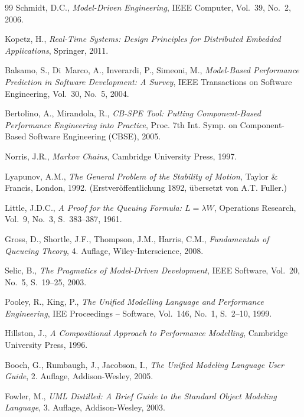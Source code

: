 ﻿\documentclass[a4paper,12pt]{report}
\theoremstyle{definition}
\begin{document}
\begin{thebibliography}{99}
	Schmidt, D.C.,
	\textit{Model-Driven Engineering},
	IEEE Computer, Vol.~39, No.~2, 2006.

	Kopetz, H.,
	\textit{Real-Time Systems: Design Principles for Distributed
		Embedded Applications},
	Springer, 2011.

	Balsamo, S., Di~Marco, A., Inverardi, P., Simeoni, M.,
	\textit{Model-Based Performance Prediction in Software Development:
		A Survey},
	IEEE Transactions on Software Engineering, Vol.~30, No.~5, 2004.

	Bertolino, A., Mirandola, R.,
	\textit{CB-SPE Tool: Putting Component-Based Performance Engineering
		into Practice},
	Proc. 7th Int. Symp. on Component-Based Software Engineering
	(CBSE), 2005.

	Norris, J.R.,
	\textit{Markov Chains},
	Cambridge University Press, 1997.

	Lyapunov, A.M.,
	\textit{The General Problem of the Stability of Motion},
	Taylor \& Francis, London, 1992.
	(Erstveröffentlichung 1892, übersetzt von A.T. Fuller.)

	Little, J.D.C.,
	\textit{A Proof for the Queuing Formula: $L = \lambda W$},
	Operations Research, Vol.~9, No.~3, S.~383--387, 1961.

	Gross, D., Shortle, J.F., Thompson, J.M., Harris, C.M.,
	\textit{Fundamentals of Queueing Theory},
	4. Auflage, Wiley-Interscience, 2008.

	Selic, B.,
	\textit{The Pragmatics of Model-Driven Development},
	IEEE Software, Vol.~20, No.~5, S.~19--25, 2003.

	Pooley, R., King, P.,
	\textit{The Unified Modelling Language and Performance Engineering},
	IEE Proceedings -- Software, Vol.~146, No.~1, S.~2--10, 1999.

	Hillston, J.,
	\textit{A Compositional Approach to Performance Modelling},
	Cambridge University Press, 1996.

	Booch, G., Rumbaugh, J., Jacobson, I.,
	\textit{The Unified Modeling Language User Guide},
	2. Auflage, Addison-Wesley, 2005.

	Fowler, M.,
	\textit{UML Distilled: A Brief Guide to the Standard Object
		Modeling Language},
	3. Auflage, Addison-Wesley, 2003.


\end{thebibliography}
\end{document}
